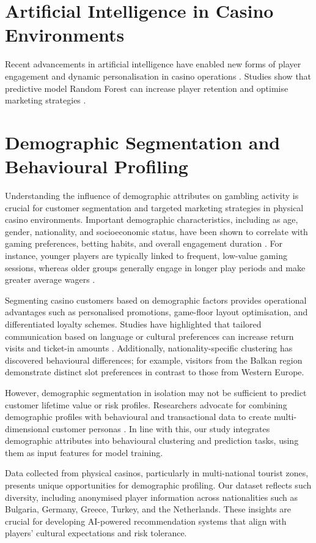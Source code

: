 \documentclass[12pt,a4paper]{report}
\begin{document}
\section{Artificial Intelligence in Casino Environments}
Recent advancements in artificial intelligence have enabled new forms of player engagement and dynamic personalisation in casino operations \citep{Auer2023, Omike2022a}. Studies show that predictive model Random Forest can increase player retention and optimise marketing strategies \citep{Ladouceur2016}.


\section{Demographic Segmentation and Behavioural Profiling}

Understanding the influence of demographic attributes on gambling activity is crucial for customer segmentation and targeted marketing strategies in physical casino environments.  Important demographic characteristics, including as age, gender, nationality, and socioeconomic status, have been shown to correlate with gaming preferences, betting habits, and overall engagement duration \citep{Hing2014}. For instance, younger players are typically linked to frequent, low-value gaming sessions, whereas older groups generally engage in longer play periods and make greater average wagers \citep{Desiata2024b}.

Segmenting casino customers based on demographic factors provides operational advantages such as personalised promotions, game-floor layout optimisation, and differentiated loyalty schemes. Studies have highlighted that tailored communication based on language or cultural preferences can increase return visits and ticket-in amounts \citep{Abarbanel2022}. Additionally, nationality-specific clustering has discovered behavioural differences; for example, visitors from the Balkan region demonstrate distinct slot preferences in contrast to those from Western Europe.

However, demographic segmentation in isolation may not be sufficient to predict customer lifetime value or risk profiles. Researchers advocate for combining demographic profiles with behavioural and transactional data to create multi-dimensional customer personas \citep{Ladouceur2016}. In line with this, our study integrates demographic attributes into behavioural clustering and prediction tasks, using them as input features for model training.

Data collected from physical casinos, particularly in multi-national tourist zones, presents unique opportunities for demographic profiling. Our dataset reflects such diversity, including anonymised player information across nationalities such as Bulgaria, Germany, Greece, Turkey, and the Netherlands. These insights are crucial for developing AI-powered recommendation systems that align with players' cultural expectations and risk tolerance.
\end{document}
